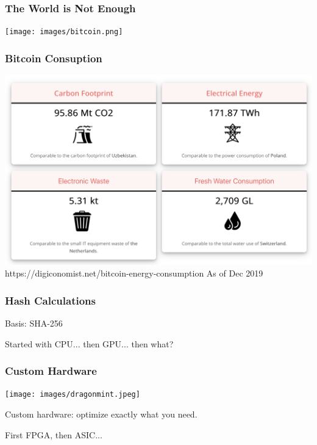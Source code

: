 \begin{frame}
\partpage
\end{frame}

\begin{frame}
\frametitle{The World is Not Enough}

\begin{center}
	\texttt{[image: images/bitcoin.png]}
\end{center}


\end{frame}


\begin{frame}
\frametitle{Bitcoin Consuption}

\begin{center}
	\includegraphics[width=\textwidth]{images/Bitcoin-usage.png}\\
	\hfill https://digiconomist.net/bitcoin-energy-consumption As of Dec 2019
\end{center}


\end{frame}

\begin{frame}
\frametitle{Hash Calculations}

Basis: SHA-256

Started with CPU... then GPU... then what?


\end{frame}

\begin{frame}
\frametitle{Custom Hardware}

\begin{center}
	\texttt{[image: images/dragonmint.jpeg]}
\end{center}

Custom hardware: optimize exactly what you need.

First FPGA, then ASIC...

\end{frame}


